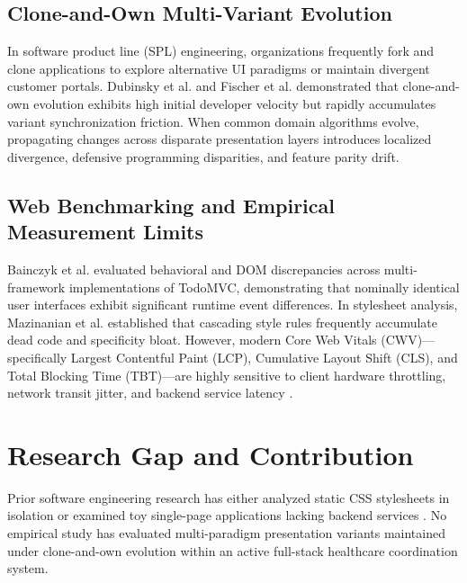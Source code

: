 \documentclass[conference]{IEEEtran}
\begin{document}
\subsection{Clone-and-Own Multi-Variant Evolution}
In software product line (SPL) engineering, organizations frequently fork and clone applications to explore alternative UI paradigms or maintain divergent customer portals. Dubinsky et al. \cite{dubinsky2013exploratory} and Fischer et al. \cite{fischer2014enhancing} demonstrated that clone-and-own evolution exhibits high initial developer velocity but rapidly accumulates variant synchronization friction. When common domain algorithms evolve, propagating changes across disparate presentation layers introduces localized divergence, defensive programming disparities, and feature parity drift.

\subsection{Web Benchmarking and Empirical Measurement Limits}
Bainczyk et al. \cite{bainczyk2017leveraging} evaluated behavioral and DOM discrepancies across multi-framework implementations of TodoMVC, demonstrating that nominally identical user interfaces exhibit significant runtime event differences. In stylesheet analysis, Mazinanian et al. \cite{mazinanian2014proceedings} established that cascading style rules frequently accumulate dead code and specificity bloat. However, modern Core Web Vitals (CWV)---specifically Largest Contentful Paint (LCP), Cumulative Layout Shift (CLS), and Total Blocking Time (TBT)---are highly sensitive to client hardware throttling, network transit jitter, and backend service latency \cite{webdev2024labfield}.

\section{Research Gap and Contribution}
Prior software engineering research has either analyzed static CSS stylesheets in isolation \cite{mazinanian2014proceedings} or examined toy single-page applications lacking backend services \cite{bainczyk2017leveraging}. No empirical study has evaluated multi-paradigm presentation variants maintained under clone-and-own evolution within an active full-stack healthcare coordination system.
\end{document}
